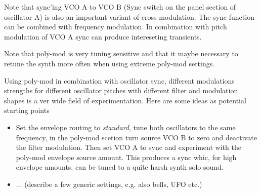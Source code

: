 Note that sync'ing VCO A to VCO B (Sync switch on the panel section of oscillator A) is also an important variant of cross-modulation. The sync function can be combined with frequency modulation. In combination with pitch modulation of VCO A sync can produce intereseting transients.  

Note that poly-mod is very tuning sensitive and that it maybe necessary to retune the synth more often when using extreme poly-mod settings.

Using poly-mod in combination with oscillator sync, different modulations strengths for different oscillator pitches with different filter and modulation shapes is a ver wide field of experimentation. Here are some ideas as potential starting points

\begin{itemize}
  \item Set the envelope routing to \textit{standard}, tune both oscillators to the same frequency, in the poly-mod scetion turn source VCO B to zero and deactivate the filter modulation. Then set VCO A to sync and experiment with the poly-mod envelope source amount. This produces a sync whic, for high envelope amounts, can be tuned to a quite harsh synth solo sound.
  \item ... (describe a few generic settings, e.g. also bells, UFO etc.)
\end{itemize} 
